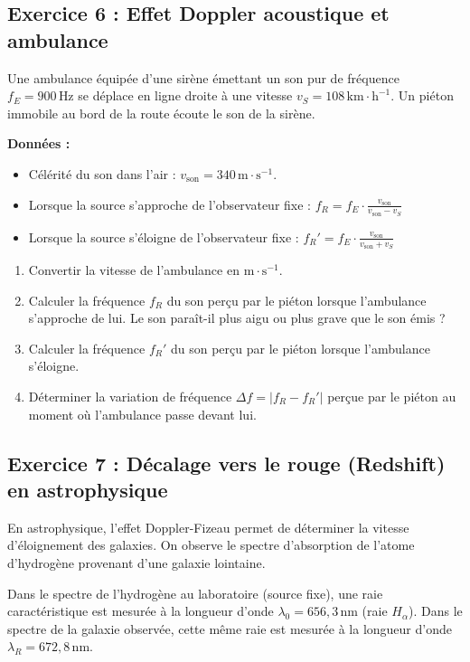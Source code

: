 \documentclass[12pt,a4paper]{article}
\begin{document}
\newpage

\subsection*{Exercice 6 : Effet Doppler acoustique et ambulance}

Une ambulance équipée d'une sirène émettant un son pur de fréquence $f_E = 900\,\text{Hz}$ se déplace en ligne droite à une vitesse $v_S = 108\,\text{km}\cdot\text{h}^{-1}$. Un piéton immobile au bord de la route écoute le son de la sirène.

\textbf{Données :}
\begin{itemize}
    \item Célérité du son dans l'air : $v_{\text{son}} = 340\,\text{m}\cdot\text{s}^{-1}$.
    \item Lorsque la source s'approche de l'observateur fixe : $f_R = f_E \cdot \frac{v_{\text{son}}}{v_{\text{son}} - v_S}$
    \item Lorsque la source s'éloigne de l'observateur fixe : $f_R' = f_E \cdot \frac{v_{\text{son}}}{v_{\text{son}} + v_S}$
\end{itemize}

\begin{enumerate}
    \item Convertir la vitesse de l'ambulance en $\text{m}\cdot\text{s}^{-1}$.
    \item Calculer la fréquence $f_R$ du son perçu par le piéton lorsque l'ambulance s'approche de lui. Le son paraît-il plus aigu ou plus grave que le son émis ?
    \item Calculer la fréquence $f_R'$ du son perçu par le piéton lorsque l'ambulance s'éloigne.
    \item Déterminer la variation de fréquence $\Delta f = |f_R - f_R'|$ perçue par le piéton au moment où l'ambulance passe devant lui.
\end{enumerate}


\subsection*{Exercice 7  : Décalage vers le rouge (Redshift) en astrophysique}

En astrophysique, l'effet Doppler-Fizeau permet de déterminer la vitesse d'éloignement des galaxies. On observe le spectre d'absorption de l'atome d'hydrogène provenant d'une galaxie lointaine.

Dans le spectre de l'hydrogène au laboratoire (source fixe), une raie caractéristique est mesurée à la longueur d'onde $\lambda_0 = 656,3\,\text{nm}$ (raie $H_\alpha$). Dans le spectre de la galaxie observée, cette même raie est mesurée à la longueur d'onde $\lambda_R = 672,8\,\text{nm}$.
\end{document}
